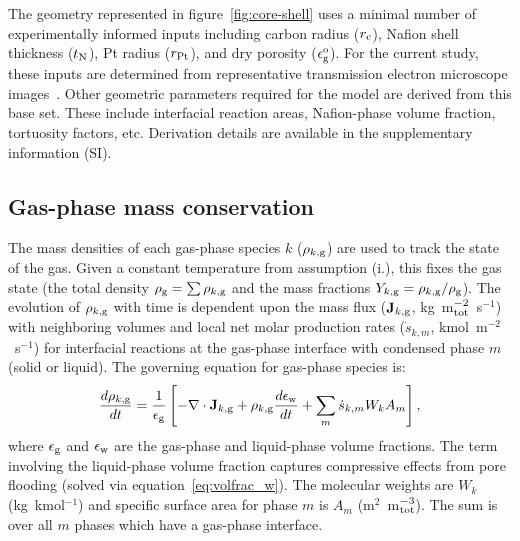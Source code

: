 \documentclass[final,3p,times,twocolumn]{elsarticle}    %
\begin{document}
The geometry represented in figure~\ref{fig:core-shell} uses a minimal number of experimentally informed inputs including carbon radius ($r_{\rm c}$), Nafion shell thickness ($t_{\rm N}$), Pt radius ($r_{\rm Pt}$), and dry porosity ($\epsilon_{\rm g}^{\rm o}$). For the current study, these inputs are determined from representative transmission electron microscope images~\cite{bib:he_2005}. Other geometric parameters required for the model are derived from this base set. These include interfacial reaction areas, Nafion-phase volume fraction, tortuosity factors, etc. Derivation details are available in the supplementary information (SI).

\subsection{Gas-phase mass conservation}

The mass densities of each gas-phase species $k$ ($\rho_{k,\rm g}$) are used to track the state of the gas. Given a constant temperature from assumption (i.), this fixes the gas state (the total density $\rho_{\rm g} = \sum \rho_{k,\rm g}$ and the mass fractions $Y_{k,\rm g} = \rho_{k,\rm g} / \rho_{\rm g}$). The evolution of $\rho_{k,\rm g}$ with time is dependent upon the mass flux (${\bf J}_{k,\rm g}$, kg~m$^{-2}_{\rm tot}$~s$^{-1}$) with neighboring volumes and local net molar production rates ($\dot{s}_{k,m}$, kmol~m$^{-2}$~s$^{-1}$) for interfacial reactions at the gas-phase interface with condensed phase $m$ (solid or liquid). The governing equation for gas-phase species is:
\begin{equation} \label{eq:mass-cons-gas}
    \frac{d \rho_{k,\rm g}}{d t} = \frac{1}{\epsilon_{\rm g}} \left[ 
    - \nabla \cdot \mathbf{J}_{k,\rm g} + \rho_{k,\rm g} \frac{d \epsilon_{\rm w}}{d t}
    + \sum_m \dot{s}_{k,m} W_k A_m \right],
\end{equation}
where $\epsilon_{\rm g}$ and $\epsilon_{\rm w}$ are the gas-phase and liquid-phase volume fractions. The term involving the liquid-phase volume fraction captures compressive effects from pore flooding (solved via equation~\ref{eq:volfrac_w}). The molecular weights are $W_k$ (kg~kmol$^{-1}$) and specific surface area for phase $m$ is $A_m$ (m$^2$~m$^{-3}_{\rm tot}$). The sum is over all $m$ phases which have a gas-phase interface.
\end{document}
